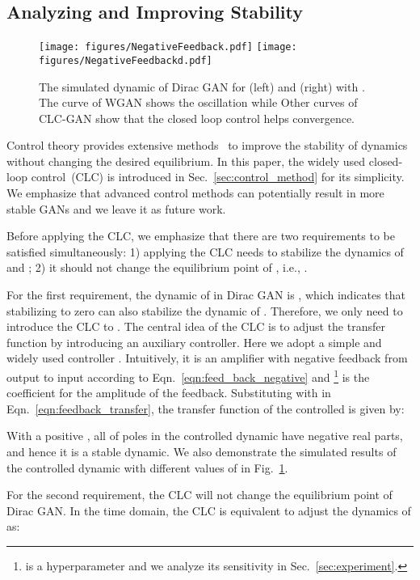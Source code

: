 \documentclass{article}
\newcommand{\fig}[1]{Fig.~\ref{fig:#1}}
\newcommand{\eqn}[1]{Eqn.~\eqref{eqn:#1}}
\newcommand{\secref}[1]{Sec.~\ref{sec:#1}} \usepackage{wrapfig}
\theoremstyle{definition}
\begin{document}
\subsection{Analyzing and Improving Stability}
\label{sec:ana_imp_stability}

\begin{figure}
	\centering
	\texttt{[image: figures/NegativeFeedback.pdf]}
	\texttt{[image: figures/NegativeFeedbackd.pdf]}
	\caption{The simulated dynamic of Dirac GAN for  (left) and  (right) with . The curve of WGAN shows the oscillation while Other curves of CLC-GAN show that the closed loop control helps convergence.}
	\label{fig:simulated_diracgan}
\end{figure}

Control theory provides extensive methods~\cite{khalil2002nonlinear} to improve the stability of dynamics without changing the desired equilibrium. In this paper, the widely used closed-loop control~(CLC) is introduced in \secref{control_method} for its simplicity. We emphasize that advanced control methods can potentially result in more stable GANs and we leave it as future work.

Before applying the CLC, we emphasize that there are two requirements to be satisfied simultaneously: 1) applying the CLC needs to stabilize the dynamics of  and ; 2) it should not change the equilibrium point of , i.e., . 

For the first requirement, the dynamic of  in Dirac GAN is , which indicates that stabilizing  to zero can also stabilize the dynamic of . Therefore, we only need to introduce the CLC to .
The central idea of the CLC is to adjust the transfer function by introducing an auxiliary controller. Here we adopt a simple and widely used controller . Intuitively, it is an amplifier with negative feedback from output to input according to \eqn{feed_back_negative} and \footnote{ is a hyperparameter and we analyze its sensitivity in \secref{experiment}.} is the coefficient for the amplitude of the feedback.
Substituting  with  in \eqn{feedback_transfer}, the transfer function  of the controlled  is given by:

With a positive , all of poles in the controlled dynamic have negative real parts, and hence it is a stable dynamic. We also demonstrate the simulated results of the controlled dynamic with different values of  in \fig{simulated_diracgan}.

For the second requirement, the CLC will not change the equilibrium point of Dirac GAN. In the time domain, the CLC is equivalent to adjust the dynamics of  as:
\end{document}
